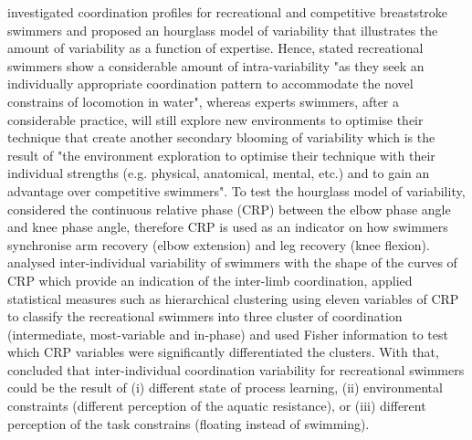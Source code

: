 \cite{seifert2011} investigated coordination profiles for recreational and 
competitive breaststroke swimmers and proposed an hourglass model of 
variability that illustrates the amount of variability as a function of 
expertise. Hence, \citealt[p. 551]{seifert2011} stated 
recreational swimmers show a considerable amount of intra-variability 
"as they seek an individually appropriate coordination pattern to accommodate
the novel constrains of locomotion in water", whereas experts swimmers, 
after a considerable practice,  
will still explore new environments to optimise their technique that 
create another secondary blooming of variability which is 
the result of "the environment exploration to optimise their technique 
with their individual strengths (e.g. physical, anatomical, mental, etc.)
and to gain an advantage over competitive swimmers".
To test the hourglass model of variability, 
\cite{seifert2011} considered the continuous relative phase (CRP) 
between the elbow phase angle and knee phase angle, therefore CRP 
is used as an indicator on how swimmers synchronise
arm recovery (elbow extension) and leg recovery (knee flexion).
\cite{seifert2011} analysed inter-individual variability of 
swimmers with the shape of the curves of CRP which provide an indication 
of the inter-limb coordination, applied statistical measures such as 
hierarchical clustering using eleven variables of CRP 
to classify the recreational swimmers into three cluster of coordination 
(intermediate, most-variable and in-phase)
and used Fisher information to test which CRP variables were significantly 
differentiated the clusters. With that, \cite{seifert2011} concluded that 
inter-individual coordination variability for recreational swimmers could be 
the result of (i) different state of process learning, (ii) environmental 
constraints (different perception of the aquatic resistance), or (iii) 
different perception of the task constrains (floating instead of swimming).

